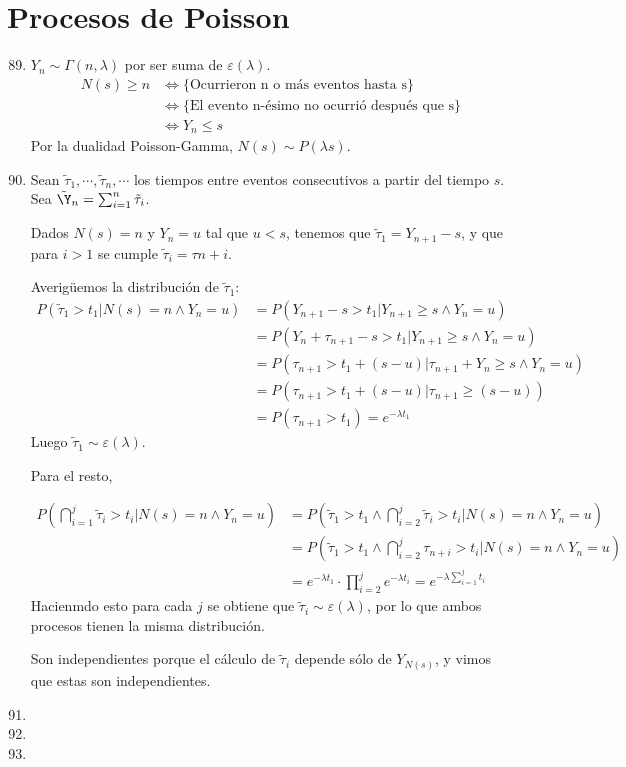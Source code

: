 \section{Procesos de Poisson}
\begin{enumerate}
	\setcounter{enumi}{88}
	\item
		$Y_n \sim \Gamma(n, \lambda)$ por ser suma de $\varepsilon(\lambda)$.
		\begin{align*}
			N(s) \geq n	& \Longleftrightarrow \{\text{Ocurrieron n o más eventos hasta s}\}			\\
						& \Longleftrightarrow \{\text{El evento n-ésimo no ocurrió después que s}\}	\\
						& \Longleftrightarrow Y_n \leq s
		\end{align*}
		Por la dualidad Poisson-Gamma, $N(s)\sim P(\lambda s)$.
	
	\item
		Sean $\tilde\tau_1, \cdots, \tilde\tau_n, \cdots$ los tiempos entre eventos consecutivos a partir del tiempo $s$. Sea $\tilde\Y_n = \sum_{i=1}^n \tilde\tau_i$.
		
		Dados $N(s) = n$ y $Y_n = u$ tal que $u<s$, tenemos que $\tilde\tau_1 = Y_{n+1}-s$, y que para $i>1$ se cumple $\tilde\tau_i = \tau{n+i}$.
		
		Averigüemos la distribución de $\tilde\tau_1$:
		\begin{align*}
			P(\tilde\tau_1 > t_1 | N(s)=n \land Y_n = u)	& = P(Y_{n+1} - s > t_1 | Y_{n+1} \geq s \land Y_n = u)						\\
															& = P(Y_n + \tau_{n+1} - s > t_1 | Y_{n+1} \geq s \land Y_n = u)			\\
															& = P(\tau_{n+1} > t_1 + (s - u) | \tau_{n+1} + Y_n \geq s \land Y_n = u)	\\
															& = P(\tau_{n+1} > t_1 + (s - u) | \tau_{n+1} \geq (s - u))					\\
															& = P(\tau_{n+1} > t_1) = e^{-\lambda t_1}
		\end{align*}
		Luego $\tilde\tau_1 \sim \varepsilon(\lambda)$.
		
		Para el resto,
		
		\begin{align*}
			P\left(\bigcap_{i=1}^j \tilde\tau_i > t_i | N(s)=n \land Y_n = u\right)	& = P\left(\tilde\tau_1 > t_1 \land \bigcap_{i=2}^j \tilde\tau_i > t_i | N(s)=n \land Y_n = u\right)	\\
																					& = P\left(\tilde\tau_1 > t_1 \land \bigcap_{i=2}^j \tau_{n+i} > t_i | N(s)=n \land Y_n = u\right)		\\
																					& = e^{-\lambda t_1} \cdot \prod_{i=2}^j e^{-\lambda t_i} = e^{-\lambda \sum_{i=1}^j t_i}
		\end{align*}
		 Hacienmdo esto para cada $j$ se obtiene que $\tilde\tau_i \sim \varepsilon(\lambda)$, por lo que ambos procesos tienen la misma distribución.
		 
		 Son independientes porque el cálculo de $\tilde\tau_i$ depende sólo de $Y_{N(s)}$, y vimos que estas son independientes.
	\item
		
	\item
	\item
\end{enumerate}
